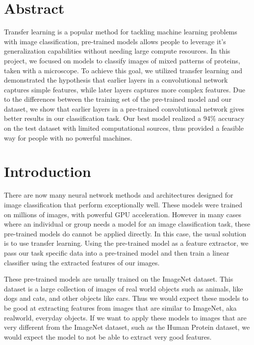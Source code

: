 \documentclass{article}
\begin{document}
\section*{Abstract}
Transfer learning is a popular method for tackling machine learning problems with image classification, 
pre-trained models allows people to leverage it's generalization capabilities without needing large compute 
resources. In this project, we focused on models to classify images of mixed patterns of proteins,
taken with a microscope. To achieve this goal, we utilized transfer learning 
and demonstrated the hypothesis that earlier layers in a convolutional network captures simple features,
while later layers captures more complex features. Due to the differences between the training set
of the pre-trained model and our dataset, we show that earlier layers in a pre-trained convolutional network
gives better results in our classification task. Our best model realized a 94\% accuracy on 
the test dataset with limited computational sources, thus provided a feasible way for people with 
no powerful machines.
\section{Introduction}
There are now many neural network methods and architectures designed for 
image classification that perform exceptionally well. These models were trained
on millions of images, with powerful GPU acceleration. However in many cases where
an individual or group needs a model for an image classification task, these pre-trained
models do cannot be applied directly. In this case, the usual solution is to use transfer learning.
Using the pre-trained model as a feature extractor, we pass our task specific data into a 
pre-trained model and then train a linear classifier using the extracted features of our images.

These pre-trained models are usually trained on the ImageNet dataset\cite{imagenet_cvpr09}. This dataset is a large
collection of images of real world objects such as animals, like dogs and cats, and other objects like cars.
Thus we would expect these models to be good at extracting features from images that are similar to ImageNet,
aka realworld, everyday objects. If we want to apply these models to images that are very different from 
the ImageNet dataset, such as the Human Protein dataset, we would expect the model to 
not be able to extract very good features.
\end{document}
